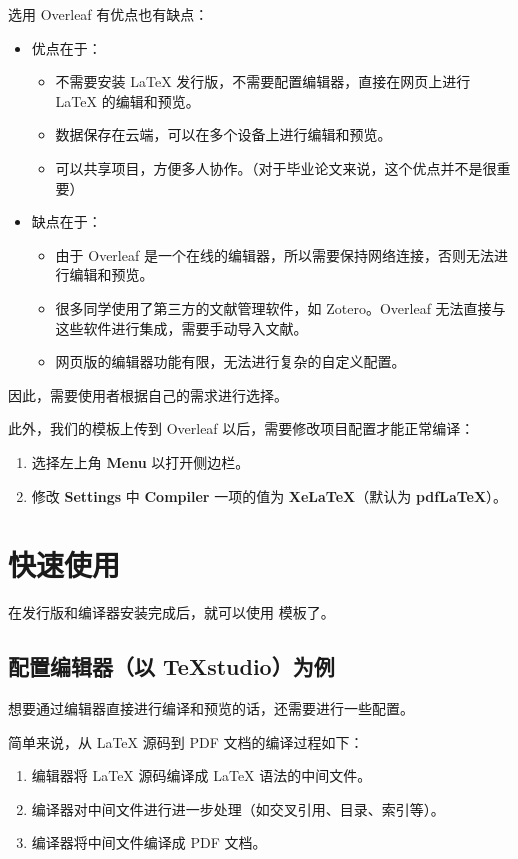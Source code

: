 选用 Overleaf 有优点也有缺点：
\begin{itemize}
  \item 优点在于：
    \begin{itemize}
      \item 不需要安装 \LaTeX{} 发行版，不需要配置编辑器，直接在网页上进行 \LaTeX{} 的编辑和预览。
      \item 数据保存在云端，可以在多个设备上进行编辑和预览。
      \item 可以共享项目，方便多人协作。（对于毕业论文来说，这个优点并不是很重要）
    \end{itemize}
  \item 缺点在于：
    \begin{itemize}
      \item 由于 Overleaf 是一个在线的编辑器，所以需要保持网络连接，否则无法进行编辑和预览。
      \item 很多同学使用了第三方的文献管理软件，如 Zotero。Overleaf 无法直接与这些软件进行集成，需要手动导入文献。
      \item 网页版的编辑器功能有限，无法进行复杂的自定义配置。
    \end{itemize}
\end{itemize}

因此，需要使用者根据自己的需求进行选择。

此外，我们的模板上传到 Overleaf 以后，需要修改项目配置才能正常编译：
\begin{enumerate}
  \item 选择左上角 \textbf{Menu} 以打开侧边栏。
  \item 修改 \textbf{Settings} 中 \textbf{Compiler} 一项的值为 \textbf{XeLaTeX}（默认为 \textbf{pdfLaTeX}）。
\end{enumerate}

\section{快速使用}

在发行版和编译器安装完成后，就可以使用 \BIThesis{}模板了。

\subsection{配置编辑器（以 TeXstudio）为例}

想要通过编辑器直接进行编译和预览的话，还需要进行一些配置。

简单来说，从 \LaTeX{} 源码到 PDF 文档的编译过程如下：
\begin{enumerate}
  \item 编辑器将 \LaTeX{} 源码编译成 \LaTeX{} 语法的中间文件。
  \item 编译器对中间文件进行进一步处理（如交叉引用、目录、索引等）。
  \item 编译器将中间文件编译成 PDF 文档。
\end{enumerate}

